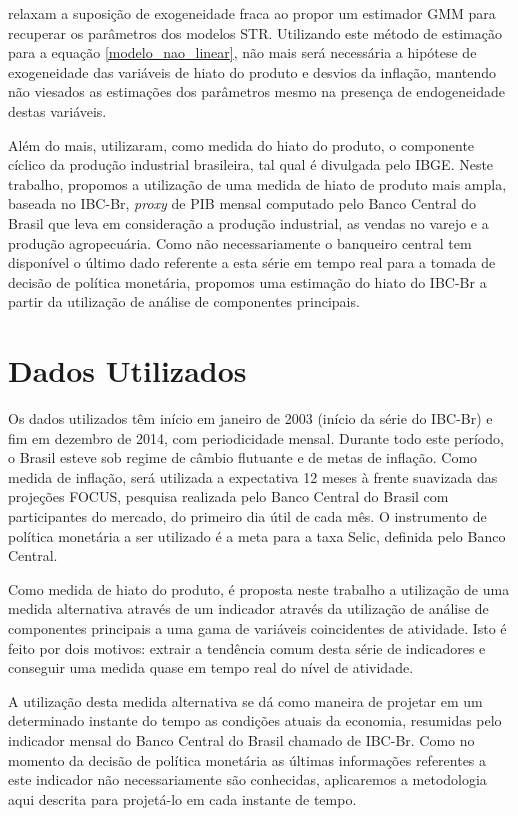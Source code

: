 \documentclass[
	article,			%
	11pt,				%
	oneside,			%
	a4paper,			%
	english,			%
	brazil,				%
	]{abntex2}
\begin{document}
{	 relaxam a suposição de exogeneidade fraca ao propor um estimador GMM para recuperar os parâmetros dos modelos STR.	Utilizando este método de estimação para a equação \ref{modelo_nao_linear}, não mais será necessária a hipótese de exogeneidade das variáveis de hiato do produto e desvios da inflação, mantendo não viesados as estimações dos parâmetros mesmo na presença de endogeneidade destas variáveis.
	
	Além do mais,  utilizaram, como medida do hiato do produto, o componente cíclico da produção industrial brasileira, tal qual é divulgada pelo IBGE. Neste trabalho, propomos a utilização de uma medida de hiato de produto mais ampla, baseada no IBC-Br, \textsl{proxy} de PIB mensal computado pelo Banco Central do Brasil que leva em consideração a produção industrial, as vendas no varejo e a produção agropecuária. Como não necessariamente o banqueiro central tem disponível o último dado referente a esta série em tempo real para a tomada de decisão de política monetária, propomos uma estimação do hiato do IBC-Br a partir da utilização de análise de componentes principais.
	
	
	\section{Dados Utilizados}
	Os dados utilizados têm início em janeiro de 2003 (início da série do IBC-Br) e fim em dezembro de 2014, com periodicidade mensal. Durante todo este período, o Brasil esteve sob regime de câmbio flutuante e de metas de inflação. Como medida de inflação, será utilizada a expectativa 12 meses à frente suavizada das projeções FOCUS, pesquisa realizada pelo Banco Central do Brasil com participantes do mercado, do primeiro dia útil de cada mês. O instrumento de política monetária a ser utilizado é a meta para a taxa Selic, definida pelo Banco Central.
	
	Como medida de hiato do produto, é proposta neste trabalho a utilização de uma medida alternativa através de um indicador através da utilização de análise de componentes principais a uma gama de variáveis coincidentes de atividade. Isto é feito por dois motivos: extrair a tendência comum desta série de indicadores e conseguir uma medida quase em tempo real do nível de atividade.
	
	A utilização desta medida alternativa se dá como maneira de projetar em um determinado instante do tempo as condições atuais da economia, resumidas pelo indicador mensal do Banco Central do Brasil chamado de IBC-Br. Como no momento da decisão de política monetária as últimas informações referentes a este indicador não necessariamente são conhecidas, aplicaremos a metodologia aqui descrita para projetá-lo em cada instante de tempo.
	
}
\end{document}
